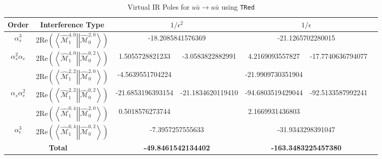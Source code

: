 \documentclass[a4paper]{article}
\def \TRed{\texttt{TRed} }
\def \MBra#1#2#3{\left<\hat{\mathcal{M}}_{#1}^{#2,#3}\right|}
\def \MKet#1#2#3{\left|\hat{\mathcal{M}}_{#1}^{#2,#3}\right>}
\begin{document}
\begin{table}[]
 \begin{tabular}{|c|c|c|c|c|c|c}\hline
 Order& Interference Type
 & \multicolumn{2}{c}{$1/\epsilon^{2}$} 
 & \multicolumn{2}{|c|}{$1/\epsilon$}\\\hline
 $\alpha_s^3$                           
 & 2Re$\left(\MBra{1}{4}{0}\MKet{0}{2}{0}\right)$
 & \multicolumn{2}{c|}{-18.2085841576369} 
 & \multicolumn{2}{c|}{-21.1265702280015} \\\hline
 \multirow{2}{*}{$\alpha_s^2\alpha_e$}                                                        
 & 2Re$\left(\MBra{1}{4}{0}\MKet{0}{0}{2}\right)$
 & 1.5055728821233 & \multirow{2}{*}{-3.0583822882991} 
 & 4.2169093557827 & \multirow{2}{*}{-17.7740636794077} \\
 & 2Re$\left(\MBra{1}{2}{2}\MKet{0}{2}{0}\right)$
 & -4.5639551704224 && -21.9909730351904 &\\\hline
 \multirow{2}{*}{$\alpha_s\alpha_e^2$}                                                  
 & 2Re$\left(\MBra{1}{2}{2}\MKet{0}{0}{2}\right)$
 & -21.6853196393154 & \multirow{2}{*}{-21.1834620119410} 
 & -94.6803519429044 & \multirow{2}{*}{-92.5133587992241} \\
 & 2Re$\left(\MBra{1}{0}{4}\MKet{0}{2}{0}\right)$
 & 0.5018576273744 && 2.1669931436803 &\\\hline
 $\alpha_e^3$                                                                             
 & 2Re$\left(\MBra{1}{0}{4}\MKet{0}{0}{2}\right)$
 & \multicolumn{2}{c|}{-7.3957257555633} 
 & \multicolumn{2}{c|}{-31.9343298391047} \\\hline
   \multicolumn{2}{|c|}{\textbf{Total}}     
 & \multicolumn{2}{c|}{\textbf{-49.8461542134402}} 
 & \multicolumn{2}{c|}{\textbf{-163.3483225457380}}\\\hline
 \end{tabular}
 \caption{Virtual IR Poles for $u\bar u\longrightarrow u\bar u$ using \TRed}
 \label{virt_uubar}
 
 
\vskip 0.75cm


\end{table}
\end{document}
